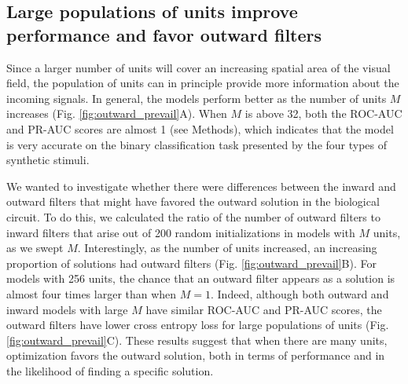 \documentclass[pdftex,9pt,lineno]{elife}
\begin{document}
\subsection{Large populations of units improve performance and favor outward filters}

Since a larger number of units will cover an increasing spatial area of the visual field, the population of units can in principle provide more information about the incoming signals. In general, the models perform better as the number of units $M$ increases (Fig. \ref{fig:outward_prevail}A). When $M$ is above 32, both the ROC-AUC and PR-AUC scores are almost 1 (see Methods), which indicates that the model is very accurate on the binary classification task presented by the four types of synthetic stimuli.

We wanted to investigate whether there were differences between the inward and outward filters that might have favored the outward solution in the biological circuit. To do this, we calculated the ratio of the number of outward filters to inward filters that arise out of 200 random initializations in models with $M$ units, as we swept $M$. Interestingly, as the number of units increased, an increasing proportion of solutions had outward filters (Fig. \ref{fig:outward_prevail}B). For models with 256 units, the chance that an outward filter appears as a solution is almost four times larger than when $M=1$. Indeed, although both outward and inward models with large $M$ have similar ROC-AUC and PR-AUC scores,  the outward filters have lower cross entropy loss for large populations of units (Fig. \ref{fig:outward_prevail}C). These results suggest that when there are many units, optimization favors the outward solution, both in terms of performance and in the likelihood of finding a specific solution.
\end{document}
